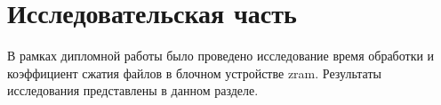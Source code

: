 \section{Исследовательская часть}

В рамках дипломной работы было проведено исследование время обработки и коэффициент сжатия файлов в блочном устройстве zram. Результаты исследования представлены в данном разделе.

\pagebreak
